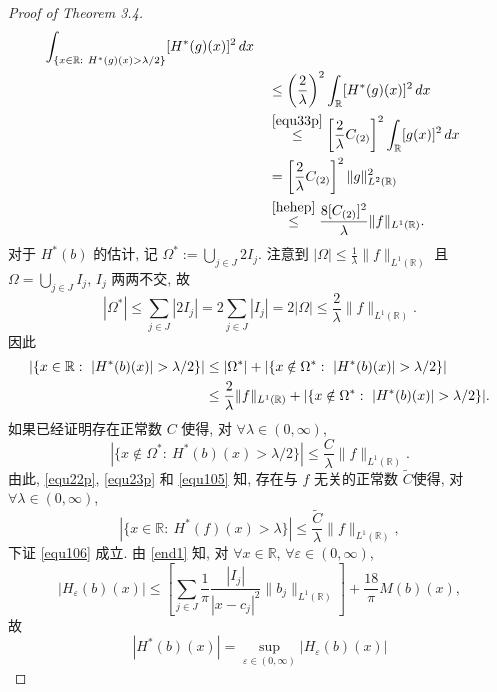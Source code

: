 \documentclass[a4paper,11pt]{article}
\theoremstyle{definition}
\begin{document}
\begin{proof}[Proof of Theorem 3.4]
\begin{align}
                \int_{\{x\in\mathbb{R} :\ H^* (g)(x) > \lambda/2 \}} [H^* (g)(x)]^2\,dx \notag \\
              	&\quad\leq \left( \frac{2}{\lambda} \right)^2
                \int_{\mathbb{R}} [H^* (g)(x)]^2 \, dx \notag \\
              	&\quad\overset{\eqref{equ33p}}{\leq} \left[ \frac{2}{\lambda} C_{(2)} \right]^2  \int_{\mathbb{R}} [g(x)]^2 \, dx \notag \\
              	&\quad= \left[ \frac{2}{\lambda} C_{(2)} \right]^2  \| g \|_{L^2(\mathbb{R})}^2 \notag \\
            &\quad\overset{\eqref{hehep}}{\leq} \frac{8 [C_{(2)}]^2}{\lambda} \| f \|_{L^1(\mathbb{R})}. \notag
    \end{align}
    对于 $ H^* (b) $ 的估计, 记 $\Omega^*:=\bigcup_{j \in J}2I_j$.
    注意到 $|\Omega|\leq \frac{1}{\lambda}\|f\|_{L^1(\mathbb{R})}$ 且 $\Omega=\bigcup_{j \in J}I_j$, $I_j$ 两两不交, 故
    $$|\Omega^*|\leq \sum_{j \in J}|2I_j|= 2\sum_{j \in J}|I_j|= 2|\Omega|\leq \frac{2}{\lambda}\|f\|_{L^1(\mathbb{R})}.$$
    因此 
    \begin{align} \label{equ105}
        |\{ x \in \mathbb{R} :\ |H^* (b) (x)| > \lambda/2 \}| 
            &\leq |\Omega^*| + |\{ x \notin \Omega^* :\ |H^* (b) (x)| > \lambda/2 \}|  \\
            &\leq \frac{2}{\lambda} \|f\|_{L^1(\mathbb{R})} 
                + |\{ x \notin \Omega^* :\ |H^* (b) (x)| > \lambda/2 \}|. \notag
    \end{align}
    如果已经证明存在正常数 $ C $ 使得, 对 $ \forall \lambda \in (0, \infty) $,
    \begin{equation} \label{equ106}
        |\{x \notin \Omega^*:\ H^* (b)(x) > \lambda / 2 \}|
            \leq \frac{C}{\lambda} \|f\|_{L^1(\mathbb{R})}.
    \end{equation}
    由此, \eqref{equ22p}, \eqref{equ23p} 和 \eqref{equ105} 知, 
    存在与 $ f $ 无关的正常数 $ \widetilde{C} $使得, 对 $ \forall \lambda \in (0, \infty) $,
    $$
        |\{x \in \mathbb{R}:\ H^* (f)(x) > \lambda \}|
            \leq \frac{\widetilde{C}}{\lambda} \|f\|_{L^1(\mathbb{R})},
    $$
    下证 \eqref{equ106} 成立.
    由 \eqref{end1} 知, 对 $ \forall x \in \mathbb{R} $, $ \forall \varepsilon \in (0, \infty) $,
    $$
        |H_\varepsilon (b) (x)| 
            \leq \left[ \sum_{j \in J} \frac{1}{\pi} \frac{|I_j|}{|x - c_j|^2} \|b_j\|_{L^1(\mathbb{R})} \right]
                + \frac{18}{\pi} M (b)(x),
    $$
    故
    $$
        |H^* (b) (x)| = \sup_{\varepsilon \in (0, \infty)} |H_\varepsilon (b) (x)| 
$$
\end{proof}
\end{document}
